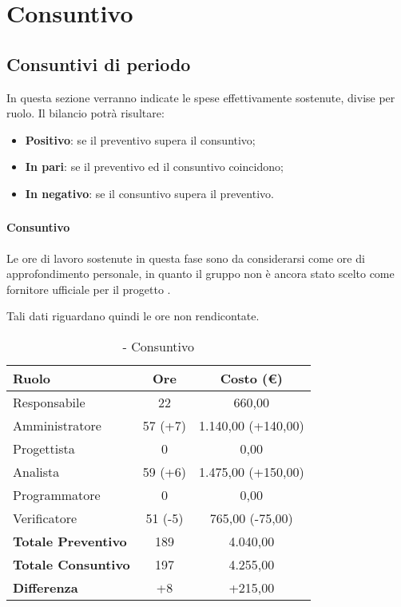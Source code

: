 \documentclass[./PianoDiProgetto.tex]{subfiles}
\begin{document}
\section{Consuntivo}
\subsection{Consuntivi di periodo}
In questa sezione verranno indicate le spese effettivamente sostenute, divise per ruolo. Il bilancio potrà risultare:
\begin{itemize}
  \item \textbf{Positivo}: se il preventivo supera il consuntivo;
  \item \textbf{In pari}: se il preventivo ed il consuntivo coincidono;
  \item \textbf{In negativo}: se il consuntivo supera il preventivo.
\end{itemize}
\subsubsection{\PerAR}
	\paragraph{Consuntivo}
Le ore di lavoro sostenute in questa fase sono da considerarsi come ore di approfondimento personale, in quanto il gruppo \GRUPPO{} non è ancora stato scelto come fornitore ufficiale per il progetto \PROGETTO.

		Tali dati riguardano quindi le ore non rendicontate.

\begin{table}[h]
		\centering
		\begin{tabular}{l * {2}{c}}
			\toprule
			\textbf{Ruolo} & \textbf{Ore} & \textbf{Costo (\euro{})} \\
			\midrule
			Responsabile &	22 & 660,00 \\
			Amministratore & 57 (+7) & 1.140,00 (+140,00)\\
			Progettista & 0 & 0,00 \\
			Analista & 59 (+6) & 1.475,00 (+150,00)\\
			Programmatore & 0 & 0,00 \\
			Verificatore & 51 (-5) & 765,00 (-75,00)\\
			\midrule
			\textbf{Totale Preventivo} & 189
 & 4.040,00
 \\
			\textbf{Totale Consuntivo} & 197 & 4.255,00
 \\
			\midrule
			\textbf{Differenza} & +8 & +215,00 \\
			\bottomrule
		\end{tabular}
		\caption{\PerAR{} - Consuntivo}
		\label{tab:consuntivoA}

	\end{table}
\end{document}
